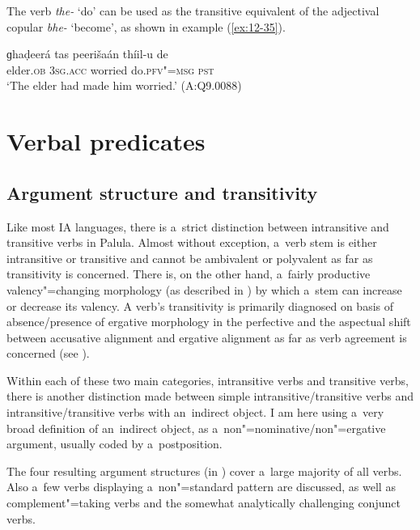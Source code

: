  The verb \textit{the-} `do' can be used as the transitive equivalent of the adjectival copular \textit{bhe-} `become', as shown in example (\ref{ex:12-35}).

\begin{exe}
\ex
\label{ex:12-35}
\gll ɡhaḍeerá tas peerišaán thíil-u de \\
elder.\textsc{ob} \textsc{3sg.acc} worried do.\textsc{pfv"=msg} \textsc{pst} \\
\glt `The elder had made him worried.' (A:Q9.0088)
\end{exe}

\section{Verbal predicates}
\label{sec:12-2}

\subsection{Argument structure and transitivity}
\label{subsec:12-2-1}


Like most IA languages, there is a~strict distinction between intransitive and transitive verbs in Palula. Almost without exception, a~verb stem is either intransitive or transitive and cannot be ambivalent or polyvalent as far as transitivity is concerned. There is, on the other hand, a~fairly productive valency"=changing morphology (as described in ) by which a~stem can increase or decrease its valency. A verb's transitivity is primarily diagnosed on basis of absence/presence of ergative morphology in the perfective and the aspectual shift between accusative alignment and ergative alignment as far as verb agreement is concerned (see ). 


Within each of these two main categories, intransitive verbs and transitive verbs, there is another distinction made between simple intransitive/transitive verbs and intransitive/transitive verbs with an~indirect object. I am here using a~very broad definition of an~indirect object, as a~non"=nominative/non"=ergative argument, usually coded by a~postposition. 


The four resulting argument structures (in ) cover a~large majority of all verbs. Also a~few verbs displaying a~non"=standard pattern are discussed, as well as complement"=taking verbs and the somewhat analytically challenging conjunct verbs.


